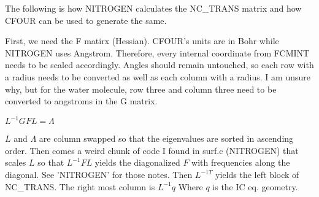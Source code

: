 \documentclass{article}
\begin{document}
The following is how NITROGEN calculates the NC\_TRANS matrix and how CFOUR can be used to generate the same.

First, we need the F matirx (Hessian). CFOUR's units are in Bohr while NITROGEN uses Angstrom. Therefore, every internal coordinate from FCMINT needs to be scaled accordingly.
Angles should remain untouched, so each row with a radius needs to be converted as well as each column with a radius.
I am unsure why, but for the water molecule, row three and column three need to be converted to angstroms in the G matrix.

$L^{-1}GFL = \Lambda$

$L$ and $\Lambda$ are column swapped so that the eigenvalues are sorted in ascending order.
Then comes a weird chunk of code I found in surf.c (NITROGEN) that scales $L$ so that $L^{-1}FL$ yields the diagonalized $F$ with frequencies along the diagonal.
See 'NITROGEN' for those notes.
Then $L^{-1 T}$ yields the left block of NC\_TRANS. The right most column is
$L^{-1}q$
Where $q$ is the IC eq. geometry.
\end{document}
